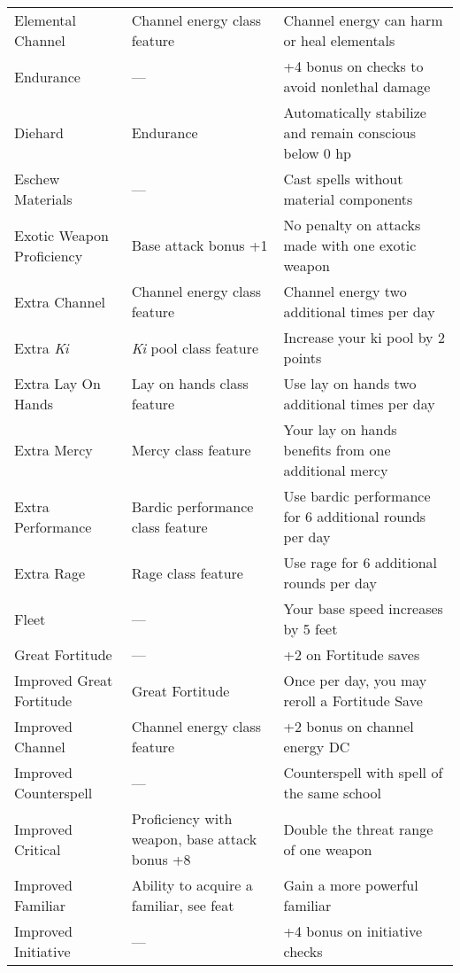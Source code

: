 \begin{table*}
\sffamily
\fontsize{9.5}{11.4}\selectfont

  \setlength{\tabcolsep}{1pt}
\begin{tabularx}{\linewidth}{lXl}
Elemental Channel & Channel energy class feature & Channel energy can harm or heal elementals\\
Endurance & --- & +4 bonus on checks to avoid nonlethal damage\\
\enspace Diehard & Endurance & Automatically stabilize and remain conscious below 0 hp\\
Eschew Materials & --- & Cast spells without material components\\
Exotic Weapon Proficiency & Base attack bonus +1 & No penalty on attacks made with one exotic weapon\\
Extra Channel & Channel energy class feature & Channel energy two additional times per day\\
Extra \textit{Ki} & \textit{Ki} pool class feature & Increase your ki pool by 2 points\\
Extra Lay On Hands & Lay on hands class feature & Use lay on hands two additional times per day\\
Extra Mercy & Mercy class feature & Your lay on hands benefits from one additional mercy\\
Extra Performance & Bardic performance class feature & Use bardic performance for 6 additional rounds per day\\
Extra Rage & Rage class feature & Use rage for 6 additional rounds per day\\
Fleet & --- & Your base speed increases by 5 feet\\
Great Fortitude & --- & +2 on Fortitude saves\\
\enspace Improved Great Fortitude & Great Fortitude & Once per day, you may reroll a Fortitude Save\\
Improved Channel & Channel energy class feature & +2 bonus on channel energy DC\\
Improved Counterspell & --- & Counterspell with spell of the same school\\
Improved Critical & Proficiency with weapon, base attack bonus +8 & Double the threat range of one weapon\\
Improved Familiar & Ability to acquire a familiar, see feat & Gain a more powerful familiar\\
Improved Initiative & --- & +4 bonus on initiative checks\\

\end{tabularx}
\end{table*}

